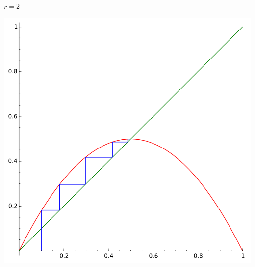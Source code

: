 \begin{frame}

  $r=2$
  \begin{center}
  \includegraphics[scale=0.5]{figures/chaos6}  
  \end{center}   

\end{frame}



   
     
     
